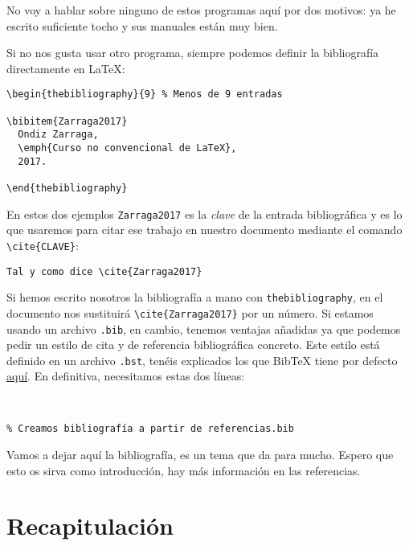 No voy a hablar sobre ninguno de estos programas aquí por dos motivos:
ya he escrito suficiente tocho y sus manuales están muy bien.

Si no nos gusta usar otro programa, siempre podemos definir la
bibliografía directamente en LaTeX:

\begin{lstlisting}[language={[latex]tex}]
\begin{thebibliography}{9} % Menos de 9 entradas

\bibitem{Zarraga2017}
  Ondiz Zarraga,
  \emph{Curso no convencional de LaTeX},
  2017.

\end{thebibliography}
\end{lstlisting}

En estos dos ejemplos \lstinline!Zarraga2017! es la \emph{clave} de la
entrada bibliográfica y es lo que usaremos para citar ese trabajo en
nuestro documento mediante el comando \lstinline!\cite{CLAVE}!:

\begin{lstlisting}[language={[latex]tex}]
Tal y como dice \cite{Zarraga2017}
\end{lstlisting}

Si hemos escrito nosotros la bibliografía a mano con
\lstinline!thebibliography!, en el documento nos sustituirá
\lstinline!\cite{Zarraga2017}! por un número. Si estamos usando un
archivo \lstinline!.bib!, en cambio, tenemos ventajas añadidas ya que
podemos pedir un estilo de cita y de referencia bibliográfica concreto.
Este estilo está definido en un archivo \lstinline!.bst!, tenéis
explicados los que BibTeX tiene por defecto
\href{https://www.sharelatex.com/learn/Bibtex_bibliography_styles}{aquí}.
En definitiva, necesitamos estas dos líneas:

\begin{lstlisting}[language={[latex]tex}]
% Definimos el estilo bibliográfico
 

% Creamos bibliografía a partir de referencias.bib 

\end{lstlisting}

Vamos a dejar aquí la bibliografía, es un tema que da para mucho. Espero
que esto os sirva como introducción, hay más información en las
referencias.

\section{Recapitulación}

